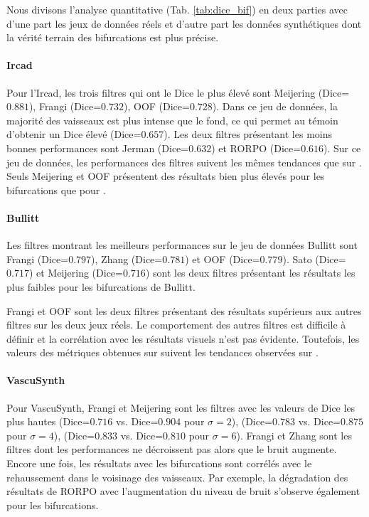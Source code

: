 Nous divisons l'analyse quantitative (Tab. \ref{tab:dice_bif}) en deux parties avec d'une part les jeux de données réels et d'autre part les données synthétiques dont la vérité terrain des bifurcations est plus précise.
\paragraph{Ircad}
Pour l'Ircad, les trois filtres qui ont le Dice le plus élevé sont Meijering (Dice=$0.881$), Frangi (Dice=$0.732$), OOF (Dice=$0.728$). Dans ce jeu de données, la majorité des vaisseaux est plus intense que le fond, ce qui permet au témoin d'obtenir un Dice élevé (Dice=$0.657$). Les deux filtres présentant les moins bonnes performances sont Jerman (Dice=$0.632$) et RORPO (Dice=$0.616$). Sur ce jeu de données, les performances des filtres suivent les mêmes tendances que sur \maskvascular. Seuls Meijering et OOF présentent des résultats bien plus élevés pour les bifurcations que pour \maskvascular.
\paragraph{Bullitt}
Les filtres montrant les meilleurs performances sur le jeu de données Bullitt sont Frangi (Dice=$0.797$), Zhang (Dice=$0.781$) et OOF (Dice=$0.779$). Sato (Dice=$0.717$) et Meijering (Dice=$0.716$) sont les deux filtres présentant les résultats les plus faibles pour les bifurcations de Bullitt. 

Frangi et OOF sont les deux filtres présentant des résultats supérieurs aux autres filtres sur les deux jeux réels. Le comportement des autres filtres est difficile à définir et la corrélation avec les résultats visuels n'est pas évidente. Toutefois, les valeurs des métriques obtenues sur \maskbif suivent les tendances observées sur \maskvascular.
\paragraph{VascuSynth}
Pour VascuSynth, Frangi et Meijering sont les filtres avec les valeurs de Dice les plus hautes (Dice=$0.716$ vs. Dice=$0.904$ pour $\sigma=2$), (Dice=$0.783$ vs. Dice=$0.875$ pour $\sigma=4$), (Dice=$0.833$ vs. Dice=$0.810$ pour $\sigma=6$). Frangi et Zhang sont les filtres dont les performances ne décroissent pas alors que le bruit augmente.
Encore une fois, les résultats avec les bifurcations sont corrélés avec le rehaussement dans le voisinage des vaisseaux. Par exemple, la dégradation des résultats de RORPO avec l'augmentation du niveau de bruit s'observe également pour les bifurcations.
